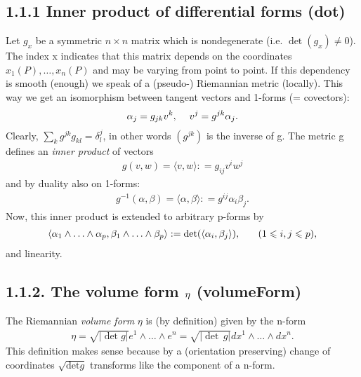 \documentclass[letterpaper,10pt,english]{sphinxmanual}
\begin{document}
\subsection{1.1.1 Inner product of differential forms (\textbf{dot})}
\label{section-1.0:inner-product-of-differential-forms-dot}
Let \(g_x\) be a symmetric \(n \times n\) matrix which is nondegenerate
(i.e. \(\det (g_x) \neq 0\)). The index x indicates that this matrix
depends on the coordinates \(x_1 (P), \ldots, x_n (P)\) and may be varying
from point to point. If this dependency is smooth (enough) we speak of a
(pseudo-) Riemannian metric (locally). This way we get an isomorphism between
tangent vectors and 1-forms (= covectors):
\begin{equation*}
\begin{split}\alpha_j = g_{j k} v^k, \hspace{1.2em} v^j = g^{j k} \alpha_j .\end{split}
\end{equation*}
Clearly, \(\sum_k g^{j k} g_{k l} = \delta^j_l\), in other words
\((g^{j k})\) is the inverse of g. The metric g defines an \emph{inner product}
of vectors
\begin{equation*}
\begin{split}g (v, w) = \langle v, w \rangle : = g_{i j} v^i w^j\end{split}
\end{equation*}
and by duality also on 1-forms:
\begin{equation*}
\begin{split}g^{- 1} (\alpha, \beta) = \langle \alpha, \beta \rangle : = g^{i j}
 \alpha_i \beta_j .\end{split}
\end{equation*}
Now, this inner product is extended to arbitrary p-forms by
\begin{equation*}
\begin{split}\langle \alpha_1 \wedge \ldots \wedge \alpha_p , \beta_1 \wedge
\ldots \wedge \beta_p \rangle : = \det (\langle \alpha_i, \beta_j \rangle)
, \hspace{1.8em} (1 \leqslant i, j \leqslant p), \label{dot}\end{split}
\end{equation*}
and linearity.


\subsection{1.1.2. The volume form \protect\(\eta\protect\) (\textbf{volumeForm})}
\label{section-1.0:the-volume-form-volumeform}
The Riemannian \emph{volume form} \(\eta\) is (by definition) given by the
n-form
\begin{equation*}
\begin{split}\eta = \sqrt{| \det g |} e^1 \wedge \ldots \wedge e^n = \sqrt{| \det\,g |} d
x^1 \wedge \ldots \wedge d x^n . \label{vol}\end{split}
\end{equation*}
This definition makes sense because by a (orientation preserving) change of
coordinates \(\sqrt{\mathrm{det} g}\) transforms like the component of
a n-form.
\end{document}
